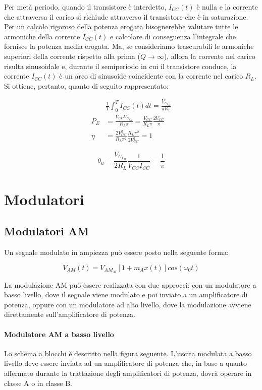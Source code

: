Per metà periodo, quando il transistore  è interdetto, $I_{CC}(t)$ è nulla e la corrente che attraversa il carico si richiude attraverso il transistore  che è in saturazione. Per un calcolo rigoroso della potenza erogata bisognerebbe valutare tutte le armoniche della corrente $I_{CC} (t)$ e calcolare di conseguenza l'integrale che fornisce la potenza media erogata. Ma, se consideriamo trascurabili le armoniche superiori della corrente rispetto alla prima ($Q\rightarrow\infty$), allora la corrente nel carico risulta sinusoidale e, durante il semiperiodo in cui il transistore  conduce, la corrente $I_{CC}(t)$ è un arco di sinusoide coincidente con la corrente nel carico $R_L$. Si ottiene, pertanto, quanto di seguito rappresentato:

$$
\begin{aligned}
& \frac{1}{T} \int_{0}^{T} I_{CC}(t) dt = 
\frac{V_{U_{1_M}}}{\pi R_L}\\
P_E  &= \frac{V_{CC} V_{U_{1_M}}}{R_L \pi}=
\frac{V_{CC}}{R_L \pi} \frac{2 V_{CC}}{\pi}\\
\eta &= \frac{2 V_{CC}^2}{R_L \pi^2} \frac{R_L \pi^2}{2 V_{CC}^2} = 1
\end{aligned}
$$

\[\theta_u = \frac{V_{U_{1_M}}}{2R_L} \frac{1}{V_{CC}I_{CC}} = \frac{1}{\pi}\]

\section{Modulatori}
\subsection{Modulatori AM}
Un segnale modulato in ampiezza può essere posto nella seguente forma:

\[V_{AM} (t) = V_{AM_M} \left[ 1 + m_A x(t)\right]cos(\omega_0t)\]

La modulazione AM può essere realizzata con due approcci: con un modulatore a basso livello, dove il segnale viene modulato e poi inviato a un amplificatore di potenza, oppure con un modulatore ad alto livello, dove la modulazione avviene direttamente sull'amplificatore di potenza.

\paragraph{Modulatore AM a basso livello}
Lo schema a blocchi è descritto nella figura seguente. L'uscita modulata a basso livello deve
essere inviata ad un amplificatore di potenza che, in base a quanto affermato durante la trattazione degli amplificatori di potenza, dovrà operare in classe A o in classe B.

